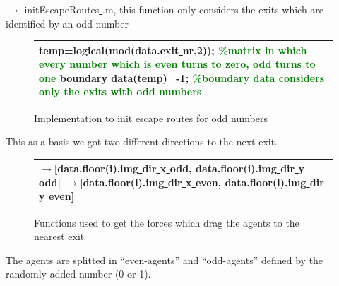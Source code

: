 \documentclass[11pt]{article}
\begin{document}
$\rightarrow$ initEscapeRoutes\underline{ }.m, this function only considers the exits which are identified by an odd number

\begin{figure}[H]
\centering
\begin{tabular}
{|>{\large}m{\textwidth}|} \hline
\bigskip
temp=logical(mod(data.exit\underline{ }nr,2)); \textcolor{green}{\%matrix in which every number which is even turns to zero, odd turns to one}
\newline
boundary\underline{ }data(temp)=-1; \textcolor{green}{\%boundary\underline{ }data considers only the exits with odd numbers}
\bigskip
\\ \hline
\end{tabular}
\caption{Implementation to init escape routes for odd numbers}
\end{figure}

This as a basis we got two different directions to the next exit.

\begin{figure}[H]
\centering
\begin{tabular}
{|>{\large}m{\textwidth}|} \hline
\bigskip
$\rightarrow$[data.floor(i).img\underline{ }dir\underline{ }x\underline{ }odd, data.floor(i).img\underline{ }dir\underline{ }y\underline{ }odd]
\newline
$\rightarrow$[data.floor(i).img\underline{ }dir\underline{ }x\underline{ }even, data.floor(i).img\underline{ }dir\underline{ }y\underline{ }even]
\bigskip
\\ \hline
\end{tabular}
\caption{Functions used to get the forces which drag the agents to the nearest exit}
\end{figure}

The agents are splitted in “even-agents” and “odd-agents” defined by the randomly added number (0 or 1).
\end{document}
